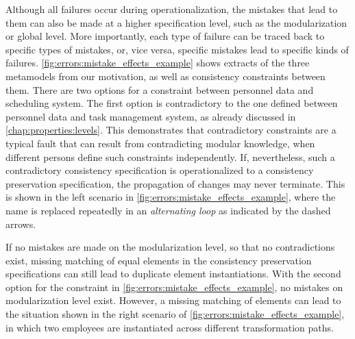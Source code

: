 Although all failures occur during operationalization, the mistakes that lead to them can also be made at a higher specification level, such as the modularization or global level.
More importantly, each type of failure can be traced back to specific types of mistakes, or, vice versa, specific mistakes lead to specific kinds of failures.
\autoref{fig:errors:mistake_effects_example} shows extracts of the three metamodels from our motivation, as well as consistency constraints between them.
There are two options for a constraint between personnel data and scheduling system.
The first option is contradictory to the one defined between personnel data and task management system, as already discussed in \autoref{chap:properties:levels}.
This demonstrates that contradictory constraints are a typical fault that can result from contradicting modular knowledge, when different persons define such constraints independently.
If, nevertheless, such a contradictory consistency specification is operationalized to a consistency preservation specification, the propagation of changes may never terminate.
This is shown in the left scenario in \autoref{fig:errors:mistake_effects_example}, where
the name is replaced repeatedly in an \emph{alternating loop} as indicated by the dashed arrows.

If no mistakes are made on the modularization level, so that no contradictions exist, %
missing matching of equal elements in the consistency preservation specifications can still lead to duplicate element instantiations.
With the second option for the constraint in \autoref{fig:errors:mistake_effects_example}, %
no mistakes on modularization level exist.
However, a missing matching of elements %
can lead to the situation shown in the right scenario of \autoref{fig:errors:mistake_effects_example}, in which two employees are instantiated across different transformation paths.

